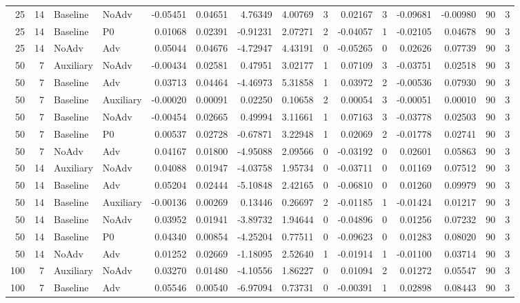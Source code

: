 \begin{longtable}{rrllrrrrrrrrrrr}
25 & 14 & Baseline & NoAdv & -0.05451 & 0.04651 & 4.76349 & 4.00769 & 3 & 0.02167 & 3 & -0.09681 & -0.00980 & 90 & 3 \\
25 & 14 & Baseline & P0 & 0.01068 & 0.02391 & -0.91231 & 2.07271 & 2 & -0.04057 & 1 & -0.02105 & 0.04678 & 90 & 3 \\
25 & 14 & NoAdv & Adv & 0.05044 & 0.04676 & -4.72947 & 4.43191 & 0 & -0.05265 & 0 & 0.02626 & 0.07739 & 90 & 3 \\
50 & 7 & Auxiliary & NoAdv & -0.00434 & 0.02581 & 0.47951 & 3.02177 & 1 & 0.07109 & 3 & -0.03751 & 0.02518 & 90 & 3 \\
50 & 7 & Baseline & Adv & 0.03713 & 0.04464 & -4.46973 & 5.31858 & 1 & 0.03972 & 2 & -0.00536 & 0.07930 & 90 & 3 \\
50 & 7 & Baseline & Auxiliary & -0.00020 & 0.00091 & 0.02250 & 0.10658 & 2 & 0.00054 & 3 & -0.00051 & 0.00010 & 90 & 3 \\
50 & 7 & Baseline & NoAdv & -0.00454 & 0.02665 & 0.49994 & 3.11661 & 1 & 0.07163 & 3 & -0.03778 & 0.02503 & 90 & 3 \\
50 & 7 & Baseline & P0 & 0.00537 & 0.02728 & -0.67871 & 3.22948 & 1 & 0.02069 & 2 & -0.01778 & 0.02741 & 90 & 3 \\
50 & 7 & NoAdv & Adv & 0.04167 & 0.01800 & -4.95088 & 2.09566 & 0 & -0.03192 & 0 & 0.02601 & 0.05863 & 90 & 3 \\
50 & 14 & Auxiliary & NoAdv & 0.04088 & 0.01947 & -4.03758 & 1.95734 & 0 & -0.03711 & 0 & 0.01169 & 0.07512 & 90 & 3 \\
50 & 14 & Baseline & Adv & 0.05204 & 0.02444 & -5.10848 & 2.42165 & 0 & -0.06810 & 0 & 0.01260 & 0.09979 & 90 & 3 \\
50 & 14 & Baseline & Auxiliary & -0.00136 & 0.00269 & 0.13446 & 0.26697 & 2 & -0.01185 & 1 & -0.01424 & 0.01217 & 90 & 3 \\
50 & 14 & Baseline & NoAdv & 0.03952 & 0.01941 & -3.89732 & 1.94644 & 0 & -0.04896 & 0 & 0.01256 & 0.07232 & 90 & 3 \\
50 & 14 & Baseline & P0 & 0.04340 & 0.00854 & -4.25204 & 0.77511 & 0 & -0.09623 & 0 & 0.01283 & 0.08020 & 90 & 3 \\
50 & 14 & NoAdv & Adv & 0.01252 & 0.02669 & -1.18095 & 2.52640 & 1 & -0.01914 & 1 & -0.01100 & 0.03714 & 90 & 3 \\
100 & 7 & Auxiliary & NoAdv & 0.03270 & 0.01480 & -4.10556 & 1.86227 & 0 & 0.01094 & 2 & 0.01272 & 0.05547 & 90 & 3 \\
100 & 7 & Baseline & Adv & 0.05546 & 0.00540 & -6.97094 & 0.73731 & 0 & -0.00391 & 1 & 0.02898 & 0.08443 & 90 & 3 \\

\end{longtable}
